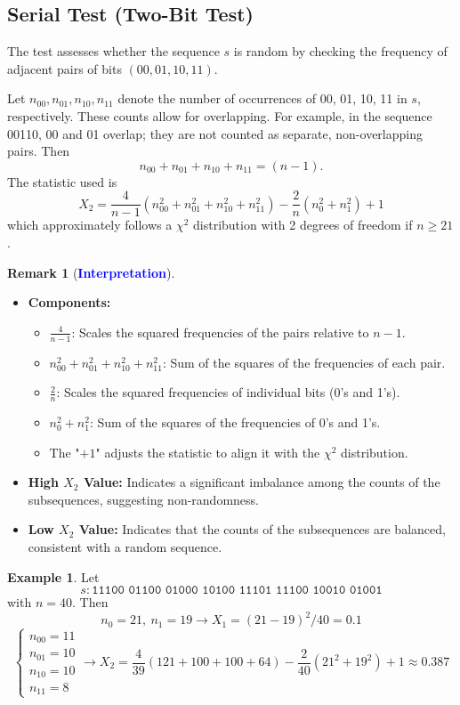 \documentclass[12pt,openany]{book}
\theoremstyle{definition}
\newtheorem{remark}{Remark}[chapter]
\newtheorem{example}{Example}[chapter]
\newcommand{\of}[1]{\left(#1\right)}
\begin{document}
\subsection{Serial Test (Two-Bit Test)}
The test assesses whether the sequence $s$ is random by checking the frequency of adjacent pairs of bits $(00, 01, 10, 11)$.

\begin{tcolorbox}[colback=white,colframe=lemcolor,arc=5pt,title={\color{white}\bf Two-Bit Test}]
	Let \( n_{00}, n_{01}, n_{10}, n_{11} \) denote the number of occurrences of 00, 01, 10, 11 in \( s \), respectively. These counts allow for overlapping. For example, in the sequence 00110, 00 and 01 overlap; they are not counted as separate, non-overlapping pairs. Then \[
	n_{00} + n_{01} + n_{10} + n_{11} = (n - 1).
	\] The statistic used is
	\[ X_2 = \frac{4}{n-1} (n_{00}^2 + n_{01}^2 + n_{10}^2 + n_{11}^2) - \frac{2}{n} (n_0^2 + n_1^2) + 1 \]
	which approximately follows a \( \chi^2 \) distribution with 2 degrees of freedom if \( n \geq 21 \).
\end{tcolorbox}
\begin{remark}[\textcolor{blue}{\bf Interpretation}]
	\ \begin{itemize}
		\item \textbf{Components:} \begin{itemize}
			\item $\frac{4}{n-1}$: Scales the squared frequencies of the pairs relative to $n-1$.
			\item $n_{00}^2 + n_{01}^2 + n_{10}^2 + n_{11}^2$: Sum of the squares of the frequencies of each pair.
			\item $\frac{2}{n}$: Scales the squared frequencies of individual bits (0's and 1's).
			\item $n_0^2+n_1^2$: Sum of the squares of the frequencies of 0's and 1's.
			\item The "$+1$" adjusts the statistic to align it with the $\chi^2$ distribution.
		\end{itemize} 
		\item \textbf{High $X_2$ Value:} Indicates a significant imbalance among the counts of the subsequences, suggesting non-randomness.
		\item \textbf{Low $X_2$ Value:} Indicates that the counts of the subsequences are balanced, consistent with a random sequence.
	\end{itemize}
\end{remark}
\begin{example}
	Let \[
	s:\texttt{11100 \ 01100 \ 01000 \ 10100 \ 11101 \ 11100 \ 10010 \ 01001}
	\] with $n=40$. Then  \[
	n_0=21,\ n_1=19\longrightarrow X_1=(21-19)^2/40=0.1
	\]\[
	\begin{cases}
		n_{00}=11\\
		n_{01}=10\\
		n_{10}=10\\
		n_{11}=8
	\end{cases}\longrightarrow X_2=\frac{4}{39}\of{121+100+100+64}-\frac{2}{40}\of{21^2+19^2}+1\approx0.387
	\]
\end{example}
\end{document}

